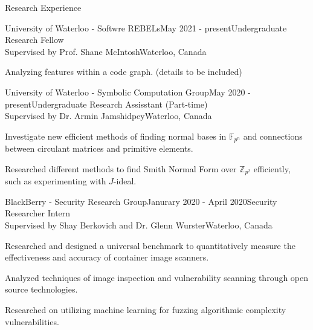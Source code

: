 \documentclass{cv}
\begin{document}
\begin{rSection}{Research Experience}
\begin{rSubsection}{University of Waterloo - Softwre REBELs}{May 2021 - present}{Undergraduate Research Fellow \\ Supervised by Prof. Shane McIntosh}{Waterloo, Canada}
	\item Analyzing features within a code graph. (details to be included)
\end{rSubsection}

\begin{rSubsection}{University of Waterloo - Symbolic Computation Group}{May 2020 - present}{Undergraduate Research Assisstant (Part-time)\\ Supervised by Dr. Armin Jamshidpey}{Waterloo, Canada}
    \item Investigate new efficient methods of finding normal bases in $\mathbb{F}_{p^n}$ and connections between circulant matrices and primitive elements.
  	\item Researched different methods to find Smith Normal Form over $\mathbb{Z}_{p^2}$ efficiently, such as experimenting with $J$-ideal.
\end{rSubsection}

\begin{rSubsection}{BlackBerry - Security Research Group}{Janurary 2020 - April 2020}{Security Researcher Intern \\ Supervised by Shay Berkovich and Dr. Glenn Wurster}{Waterloo, Canada}
	\item Researched and designed a universal benchmark to quantitatively measure the effectiveness and accuracy of container image scanners.
	\item Analyzed techniques of image inspection and vulnerability scanning through open source technologies.
	\item Researched on utilizing machine learning for fuzzing algorithmic complexity vulnerabilities.
\end{rSubsection}
\end{rSection}
\end{document}
